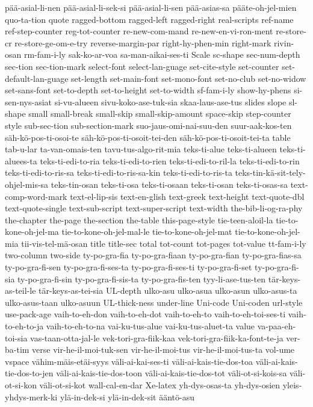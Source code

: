 {  pää-asial-li-nen
  pää-asial-li-sek-si
  pää-asial-li-sen
  pää-asias-sa
  pääte-oh-jel-mien
  quo-ta-tion
  quote
  ragged-bottom
  ragged-left
  ragged-right
  real-scripts
  ref-name
  ref-step-counter
  reg-tot-counter
  re-new-com-mand
  re-new-en-vi-ron-ment
  re-store-cr
  re-store-ge-om-e-try
  reverse-margin-par
  right-hy-phen-min
  right-mark
  rivin-osan
  rm-fam-i-ly
  sak-ko-ar-voa
  sa-man-aikai-ses-ti
  Scale
  sc-shape
  sec-num-depth
  sec-tion
  sec-tion-mark
  select-font
  select-lan-guage
  set-cite-style
  set-counter
  set-default-lan-guage
  set-length
  set-main-font
  set-mono-font
  set-no-club
  set-no-widow
  set-sans-font
  set-to-depth
  set-to-height
  set-to-width
  sf-fam-i-ly
  show-hy-phens
  si-sen-nys-asiat
  si-vu-alueen
  sivu-koko-ase-tuk-sia
  skaa-laus-ase-tus
  slides
  slope
  sl-shape
  small
  small-break
  small-skip
  small-skip-amount
  space-skip
  step-counter
  style
  sub-sec-tion
  sub-section-mark
  suo-jaus-omi-nai-suu-den
  suur-aak-kos-ten
  säh-kö-pos-ti-osoi-te
  säh-kö-pos-ti-osoit-tei-den
  säh-kö-pos-ti-osoit-tei-ta
  table
  tab-u-lar
  ta-van-omais-ten
  tavu-tus-algo-rit-mia
  teks-ti-alue
  teks-ti-alueen
  teks-ti-aluees-ta
  teks-ti-edi-to-ria
  teks-ti-edi-to-rien
  teks-ti-edi-to-ril-la
  teks-ti-edi-to-rin
  teks-ti-edi-to-ris-sa
  teks-ti-edi-to-ris-sa-kin
  teks-ti-edi-to-ris-ta
  teks-tin-kä-sit-tely-ohjel-mis-sa
  teks-tin-osan
  teks-ti-osa
  teks-ti-osaan
  teks-ti-osan
  teks-ti-osas-sa
  text-comp-word-mark
  text-el-lip-sis
  text-en-glish
  text-greek
  text-height
  text-quote-dbl
  text-quote-single
  text-sub-script
  text-super-script
  text-width
  the-bib-li-og-ra-phy
  the-chapter
  the-page
  the-section
  the-table
  this-page-style
  tie-teen-aloil-la
  tie-to-kone-oh-jel-ma
  tie-to-kone-oh-jel-mal-le
  tie-to-kone-oh-jel-mat
  tie-to-kone-oh-jel-mia
  tii-vis-tel-mä-osan
  title
  title-sec
  total
  tot-count
  tot-pages
  tot-value
  tt-fam-i-ly
  two-column
  two-side
  ty-po-gra-fia
  ty-po-gra-fiaan
  ty-po-gra-fian
  ty-po-gra-fias-sa
  ty-po-gra-fi-sen
  ty-po-gra-fi-ses-ta
  ty-po-gra-fi-ses-ti
  ty-po-gra-fi-set
  ty-po-gra-fi-sia
  ty-po-gra-fi-sin
  ty-po-gra-fi-sis-ta
  ty-po-gra-fis-ten
  tyy-li-ase-tus-ten
  tär-keys-as-teil-le
  tär-keys-as-tei-sia
  UL-depth
  ulko-asu
  ulko-asua
  ulko-asun
  ulko-asus-ta
  ulko-asus-taan
  ulko-asuun
  UL-thick-ness
  under-line
  Uni-code
  Uni-coden
  url-style
  use-pack-age
  vaih-to-eh-don
  vaih-to-eh-dot
  vaih-to-eh-to
  vaih-to-eh-toi-ses-ti
  vaih-to-eh-to-ja
  vaih-to-eh-to-na
  vai-ku-tus-alue
  vai-ku-tus-aluet-ta
  value
  va-paa-eh-toi-sia
  vas-taan-otta-jal-le
  vek-tori-gra-fiik-kaa
  vek-tori-gra-fiik-ka-font-te-ja
  ver-ba-tim
  verse
  vir-he-il-moi-tuk-sen
  vir-he-il-moi-tus
  vir-he-il-moi-tus-ta
  vol-ume
  vspace
  vähim-mäis-etäi-syys
  väli-ai-kai-ses-ti
  väli-ai-kais-tie-dos-toa
  väli-ai-kais-tie-dos-to-jen
  väli-ai-kais-tie-dos-toon
  väli-ai-kais-tie-dos-tot
  väli-ot-si-kois-sa
  väli-ot-si-kon
  väli-ot-si-kot
  wall-cal-en-dar
  Xe-latex
  yh-dys-osas-ta
  yh-dys-osien
  yleis-yhdys-merk-ki
  ylä-in-dek-si
  ylä-in-dek-sit
  ääntö-asu
}
